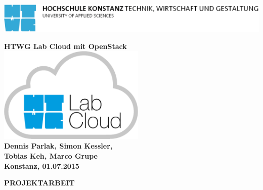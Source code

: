 \begin{titlepage}

\vspace*{-3.5cm}

\begin{flushleft}
\hspace*{-1cm} \includegraphics[width=15.7cm]{htwg-logo}
\end{flushleft}

\vspace{2cm}

\begin{center}
	\huge{
		\textbf{HTWG Lab Cloud mit OpenStack} \\[2cm]
	}
	\includegraphics[width=7cm]{img/logo.png} \\[2cm]
	\Large{
		\textbf{Dennis Parlak, Simon Kessler,\\Tobias Keh, Marco Grupe}} \\[6cm]
	\large{
		\textbf{Konstanz, 01.07.2015} \\[2.3cm]
	}
	
	\Huge{
		\textbf{{\sf PROJEKTARBEIT}}
	}
\end{center}

\end{titlepage}